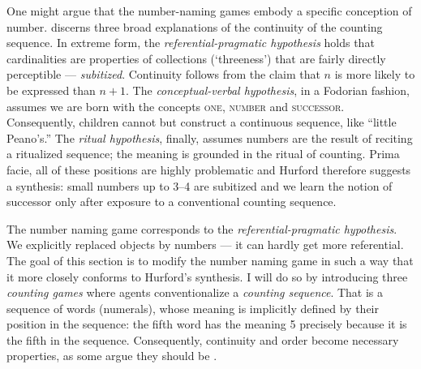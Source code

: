 \documentclass{../src/bcthesispart}
\begin{document}
One might argue that the number-naming games embody a specific conception of number.
\textcite{Hurford1987} discerns three broad explanations of the continuity of the counting sequence.
In extreme form, the \emph{referential-pragmatic hypothesis} holds that cardinalities are properties of collections (‘threeness’) that are fairly directly perceptible — \emph{subitized}.
Continuity follows from the claim that $n$ is more likely to be expressed than $n+1$. 
The \emph{conceptual-verbal hypothesis}, in a Fodorian fashion, assumes we are born with the concepts \textsc{one}, \textsc{number} and \textsc{successor}.
Consequently, children cannot but construct a continuous sequence, like “little Peano’s.”
The \emph{ritual hypothesis}, finally, assumes numbers are the result of reciting a ritualized sequence; the meaning is grounded in the ritual of counting.
Prima facie, all of these positions are highly problematic and Hurford therefore suggests a synthesis: small numbers up to 3--4 are subitized and we learn the notion of successor only after exposure to a conventional counting sequence.

The number naming game corresponds to the \emph{referential-pragmatic hypothesis}.
We explicitly replaced objects by numbers — it can hardly get more referential. 
The goal of this section is to modify the number naming game in such a way that it more closely conforms to Hurford's synthesis.
I will do so by introducing three \emph{counting games} where agents conventionalize a \emph{counting sequence}.
That is a sequence of words (numerals), whose meaning is implicitly defined by their position in the sequence: the fifth word has the meaning 5 precisely because it is the fifth in the sequence.
Consequently, continuity and order become necessary properties, as some argue they should be \parencite{VonMengden2008}.
\end{document}
